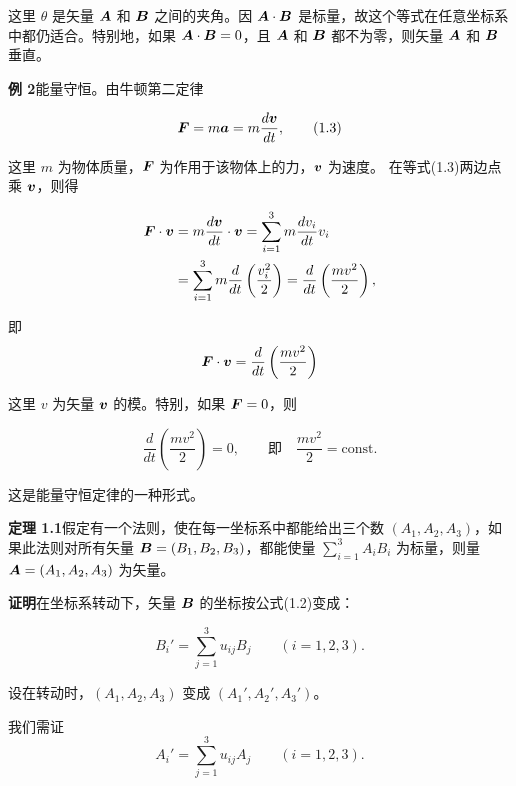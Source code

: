 这里 $\theta$ 是矢量 $\bm{A}$ 和 $\bm{B}$ 之间的夹角。因 $\bm{A} \cdot \bm{B}$ 是标量，故这个等式在任意坐标系中都仍适合。特别地，如果 $\bm{A} \cdot \bm{B} = 0$，且 $\bm{A}$ 和 $\bm{B}$ 都不为零，则矢量 $\bm{A}$ 和 $\bm{B}$ 垂直。

\textbf{例 2}\quad 能量守恒。由牛顿第二定律

\begin{equation}
\bm{F} = m \bm{a} = m \frac{d\bm{v}}{dt},
\tag{1.3}
\end{equation}

这里 $m$ 为物体质量，$\bm{F}$ 为作用于该物体上的力，$\bm{v}$ 为速度。
在等式(1.3)两边点乘 $\bm{v}$，则得

\begin{equation*}
\begin{aligned}
\bm{F} \cdot \bm{v}
&= m \frac{d\bm{v}}{dt} \cdot \bm{v} = \sum_{i=1}^{3} m \frac{dv_i}{dt} v_i\\
&= \sum_{i=1}^{3} m \frac{d}{dt} \left(\frac{v_i^{2}}{2}\right) = \frac{d}{dt} \left(\frac{m v^{2}}{2}\right),
\end{aligned}
\end{equation*}

即
\begin{equation*}
\bm{F} \cdot \bm{v} = \frac{d}{dt} \left(\frac{m v^{2}}{2}\right)
\end{equation*}

这里 $v$ 为矢量 $\bm{v}$ 的模。特别，如果 $\bm{F} = 0$，则

\begin{equation*}
\frac{d}{dt} \left(\frac{m v^{2}}{2}\right) = 0, \qquad \text{即} \quad \frac{m v^{2}}{2} = \mathrm{const}.
\end{equation*}

这是能量守恒定律的一种形式。

\textbf{定理 1.1}\quad 假定有一个法则，使在每一坐标系中都能给出三个数 $(A_1, A_2, A_3)$，如果此法则对所有矢量 $\bm{B} = (B_1, B_2, B_3)$，都能使量 $\sum_{i=1}^{3} A_i B_i$ 为标量，则量 $\bm{A} = (A_1, A_2, A_3)$ 为矢量。

\textbf{证明}\quad 在坐标系转动下，矢量 $\bm{B}$ 的坐标按公式(1.2)变成：

\begin{equation*}
B_i' = \sum_{j=1}^{3} u_{ij} B_j \qquad (i = 1, 2, 3).
\end{equation*}

设在转动时，$(A_1, A_2, A_3)$ 变成 $(A_1', A_2', A_3')$。

我们需证
\begin{equation*}
A_i' = \sum_{j=1}^{3} u_{ij} A_j \qquad (i = 1, 2, 3).
\end{equation*}

